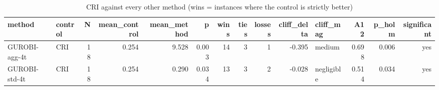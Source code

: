 \begin{table}[htbp]
\centering
\small
\caption{CRI against every other method (wins = instances where the control is strictly better)}
\label{tab:E7_gurobi_threads_b10_vs_CRI}
\begin{tabular}{llrrrrrrrrlrrr}
\toprule
method & control & N & mean\_control & mean\_method & p & wins & ties & losses & cliff\_delta & cliff\_mag & A12 & p\_holm & significant \\
\midrule
GUROBI-agg-4t & CRI & 18 & 0.254 & 9.528 & 0.003 & 14 & 3 & 1 & -0.395 & medium & 0.698 & 0.006 & yes \\
GUROBI-std-4t & CRI & 18 & 0.254 & 0.290 & 0.034 & 13 & 3 & 2 & -0.028 & negligible & 0.514 & 0.034 & yes \\
\bottomrule
\end{tabular}
\end{table}
